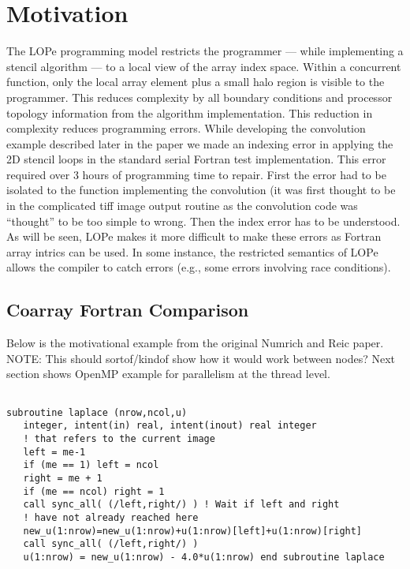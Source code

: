 \section{Motivation}

The LOPe programming model restricts the programmer --- while implementing a stencil
algorithm --- to a local view of the array index space.  Within a concurrent function,
only the local array element plus a small halo region is visible to the programmer.
This reduces complexity by all boundary conditions and processor topology information
from the algorithm implementation.  This reduction in complexity reduces programming
errors.  While developing the convolution example described later in the paper we
made an indexing error in applying the 2D stencil loops in the standard serial 
Fortran test implementation.  This error required over 3 hours of programming time
to repair.  First the error had to be isolated to the function implementing the
convolution (it was first thought to be in the complicated tiff image output routine
as the convolution code was ``thought'' to be too simple to wrong.  Then the index
error has to be understood.  As will be seen, LOPe makes it more difficult to make
these errors as Fortran array intrics can be used.  In some instance, the restricted
semantics of LOPe allows the compiler to catch errors (e.g., some errors involving
race conditions).


\subsection{Coarray Fortran Comparison}

Below is the motivational example from the original Numrich and Reic paper.
{NOTE: This should sortof/kindof show how it would work between nodes?  Next
section shows OpenMP example for parallelism at the thread level.}

{\small
\begin{verbatim}

subroutine laplace (nrow,ncol,u)
   integer, intent(in) real, intent(inout) real integer
   ! that refers to the current image
   left = me-1
   if (me == 1) left = ncol
   right = me + 1
   if (me == ncol) right = 1
   call sync_all( (/left,right/) ) ! Wait if left and right
   ! have not already reached here
   new_u(1:nrow)=new_u(1:nrow)+u(1:nrow)[left]+u(1:nrow)[right]
   call sync_all( (/left,right/) )
   u(1:nrow) = new_u(1:nrow) - 4.0*u(1:nrow) end subroutine laplace

\end{verbatim}
}


